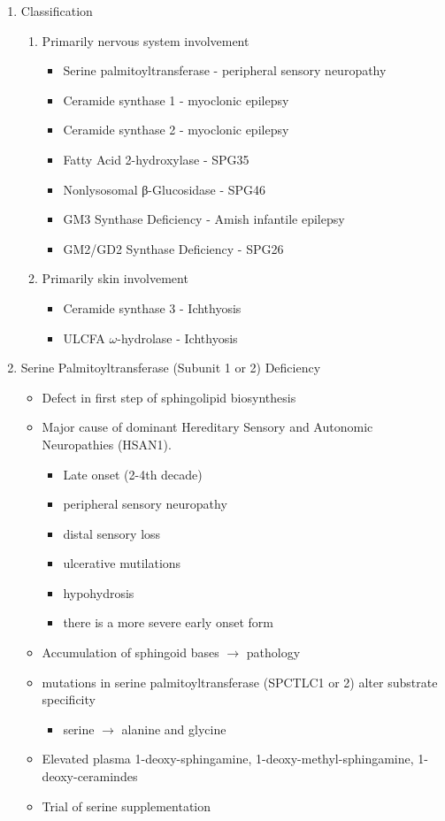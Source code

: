 \documentclass{scrartcl}
\begin{document}
\begin{enumerate}
\item Classification
\label{sec:org03e131c}

\begin{enumerate}
\item Primarily nervous system involvement
\label{sec:org7b72a94}
\begin{itemize}
\item Serine palmitoyltransferase - peripheral sensory neuropathy
\item Ceramide synthase 1 - myoclonic epilepsy
\item Ceramide synthase 2 - myoclonic epilepsy
\item Fatty Acid 2-hydroxylase - SPG35
\item Nonlysosomal β-Glucosidase - SPG46
\item GM3 Synthase Deficiency - Amish infantile epilepsy
\item GM2/GD2 Synthase Deficiency - SPG26
\end{itemize}

\item Primarily skin involvement
\label{sec:orga77a188}
\begin{itemize}
\item Ceramide synthase 3 - Ichthyosis
\item ULCFA \(\omega\)-hydrolase - Ichthyosis
\end{itemize}
\end{enumerate}


\item Serine Palmitoyltransferase (Subunit 1 or 2) Deficiency
\label{sec:orgd7cd845}

\begin{itemize}
\item Defect in first step of sphingolipid biosynthesis
\item Major cause of dominant Hereditary Sensory and Autonomic Neuropathies (HSAN1).
\begin{itemize}
\item Late onset (2-4th decade)
\item peripheral sensory neuropathy
\item distal sensory loss
\item ulcerative mutilations
\item hypohydrosis
\item there is a more severe early onset form
\end{itemize}
\item Accumulation of sphingoid bases \(\to\) pathology
\item mutations in serine palmitoyltransferase (SPCTLC1 or 2) alter
substrate specificity
\begin{itemize}
\item serine \(\to\) alanine and glycine
\end{itemize}
\item Elevated plasma 1-deoxy-sphingamine, 1-deoxy-methyl-sphingamine, 1-deoxy-ceramindes
\item Trial of serine supplementation
\end{itemize}


\end{enumerate}
\end{document}
